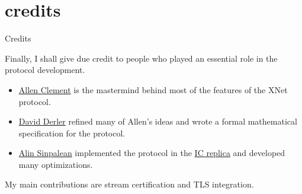\documentclass{article}
\begin{document}
\section{credits}{Credits}

Finally, I shall give due credit to people who played an essential role in the protocol development.
\begin{itemize}
\item
  \href{https://www.linkedin.com/in/allen-clement-b73a4652/}{Allen Clement} is the mastermind behind most of the features of the XNet protocol.
\item
  \href{https://www.linkedin.com/in/david-derler-08630495/}{David Derler} refined many of Allen's ideas and wrote a formal mathematical specification for the protocol.
\item
  \href{https://www.linkedin.com/in/alin-sinpalean-8451b8139/}{Alin Sinpalean} implemented the protocol in the \href{https://github.com/dfinity/ic/tree/3fe4137c86ab0521c39089954c03d7fb29e2c3d2/rs/xnet}{IC replica} and developed many optimizations.
\end{itemize}

My main contributions are stream certification and TLS integration.
\end{document}

